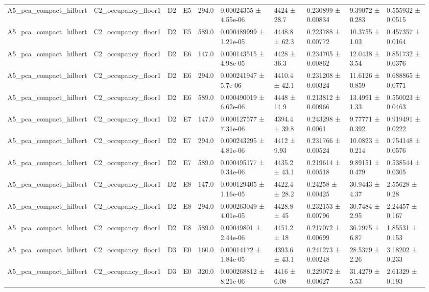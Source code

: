 \begin{table}
\begin{tabular}{llllllllll}
A5\_pca\_compact\_hilbert & C2\_occupancy\_floor1 & D2 & E5 & 294.0 & 0.00024355 ± 4.55e-06 & 4424 ± 28.7 & 0.230899 ± 0.00834 & 9.39072 ± 0.283 & 0.555932 ± 0.0515 \\
A5\_pca\_compact\_hilbert & C2\_occupancy\_floor1 & D2 & E5 & 589.0 & 0.000489999 ± 1.21e-05 & 4448.8 ± 62.3 & 0.223788 ± 0.00772 & 10.3755 ± 1.03 & 0.457357 ± 0.0164 \\
A5\_pca\_compact\_hilbert & C2\_occupancy\_floor1 & D2 & E6 & 147.0 & 0.000143515 ± 4.98e-05 & 4428 ± 36.3 & 0.234705 ± 0.00862 & 12.0438 ± 3.54 & 0.851732 ± 0.0376 \\
A5\_pca\_compact\_hilbert & C2\_occupancy\_floor1 & D2 & E6 & 294.0 & 0.000241947 ± 5.7e-06 & 4410.4 ± 42.1 & 0.231208 ± 0.00324 & 11.6126 ± 0.859 & 0.688865 ± 0.0771 \\
A5\_pca\_compact\_hilbert & C2\_occupancy\_floor1 & D2 & E6 & 589.0 & 0.000490019 ± 6.62e-06 & 4448 ± 14.9 & 0.213812 ± 0.00966 & 13.4991 ± 1.33 & 0.550023 ± 0.0463 \\
A5\_pca\_compact\_hilbert & C2\_occupancy\_floor1 & D2 & E7 & 147.0 & 0.000127577 ± 7.31e-06 & 4394.4 ± 39.8 & 0.243298 ± 0.0061 & 9.77771 ± 0.392 & 0.919491 ± 0.0222 \\
A5\_pca\_compact\_hilbert & C2\_occupancy\_floor1 & D2 & E7 & 294.0 & 0.000243295 ± 4.81e-06 & 4412 ± 9.93 & 0.231766 ± 0.00524 & 10.0823 ± 0.214 & 0.754148 ± 0.0576 \\
A5\_pca\_compact\_hilbert & C2\_occupancy\_floor1 & D2 & E7 & 589.0 & 0.000495177 ± 9.34e-06 & 4435.2 ± 43.1 & 0.219614 ± 0.00518 & 9.89151 ± 0.479 & 0.538544 ± 0.0305 \\
A5\_pca\_compact\_hilbert & C2\_occupancy\_floor1 & D2 & E8 & 147.0 & 0.000129405 ± 1.16e-05 & 4422.4 ± 28.2 & 0.24258 ± 0.00425 & 30.9443 ± 4.37 & 2.55628 ± 0.28 \\
A5\_pca\_compact\_hilbert & C2\_occupancy\_floor1 & D2 & E8 & 294.0 & 0.000263049 ± 4.01e-05 & 4428.8 ± 45 & 0.232153 ± 0.00796 & 30.7484 ± 2.95 & 2.24457 ± 0.167 \\
A5\_pca\_compact\_hilbert & C2\_occupancy\_floor1 & D2 & E8 & 589.0 & 0.00049801 ± 2.44e-06 & 4451.2 ± 18 & 0.217072 ± 0.00699 & 36.7975 ± 6.87 & 1.85531 ± 0.153 \\
A5\_pca\_compact\_hilbert & C2\_occupancy\_floor1 & D3 & E0 & 160.0 & 0.00014172 ± 1.84e-05 & 4393.6 ± 43.1 & 0.241273 ± 0.00248 & 28.5379 ± 2.26 & 3.18202 ± 0.233 \\
A5\_pca\_compact\_hilbert & C2\_occupancy\_floor1 & D3 & E0 & 320.0 & 0.000268812 ± 8.21e-06 & 4416 ± 6.08 & 0.229072 ± 0.00627 & 31.4279 ± 5.53 & 2.61329 ± 0.193 \\

\end{tabular}
\end{table}
